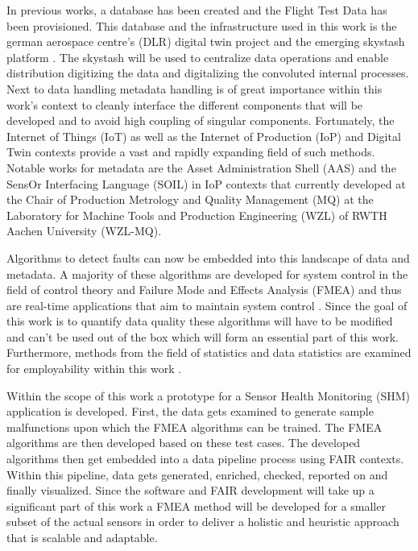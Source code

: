 In previous works, a database has been created and the Flight Test Data has been provisioned. This database and the infrastructure used in this work is the german aerospace centre's (DLR) digital twin project and the emerging skystash platform \cite{meyer_development_2020, arts_digital_2022}. The skystash will be used to centralize data operations and enable distribution digitizing the data and digitalizing the convoluted internal processes. Next to data handling metadata handling is of great importance within this work's context to cleanly interface the different components that will be developed and to avoid high coupling of singular components. Fortunately, the Internet of Things (IoT) as well as the Internet of Production (IoP)\cite{pennekamp_towards_2019} and Digital Twin contexts provide a vast and rapidly expanding field of such methods. Notable works for metadata are the Asset Administration Shell (AAS) \cite{bader_details_2020} and the SensOr Interfacing Language (SOIL) \cite{behrens_domain-specific_2021, bodenbenner_model-driven_2022} in IoP contexts that currently developed at the Chair of Production Metrology and Quality Management (MQ) at the Laboratory for Machine Tools and Production Engineering (WZL) of RWTH Aachen University (WZL-MQ).

Algorithms to detect faults can now be embedded into this landscape of data and metadata. A majority of these algorithms are developed for system control in the field of control theory and Failure Mode and Effects Analysis (FMEA) and thus are real-time applications that aim to maintain system control \cite{isermann_fault-diagnosis_2006}. Since the goal of this work is to quantify data quality these algorithms will have to be modified and can't be used out of the box which will form an essential part of this work. Furthermore, methods from the field of statistics and data statistics are examined for employability within this work \cite{handl_multivariate_2017}.




Within the scope of this work a prototype for a Sensor Health Monitoring (SHM) application is developed. First, the data gets examined to generate sample malfunctions upon which the FMEA algorithms can be trained. The FMEA algorithms are then developed based on these test cases. The developed algorithms then get embedded into a data pipeline process using FAIR contexts. Within this pipeline, data gets generated, enriched, checked, reported on and finally visualized. Since the software and FAIR development will take up a significant part of this work a FMEA method will be developed for a smaller subset of the actual sensors in order to deliver a holistic and heuristic approach that is scalable and adaptable.

